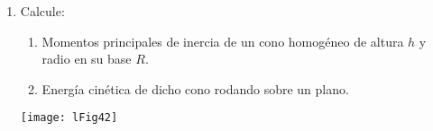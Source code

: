 \documentclass[11pt,spanish,a4paper]{article}
\begin{document}
\begin{enumerate}
\item 
\begin{minipage}[t][3.5cm]{0.5\textwidth}
Calcule:
	\begin{enumerate}
		\item Momentos principales de inercia de un cono homogéneo de altura \(h\) y radio en su base \(R\).
		\item Energía cinética de dicho cono rodando sobre un plano.
	\end{enumerate}
\end{minipage}
\begin{minipage}[c][1cm][t]{0.45\textwidth}
	\texttt{[image: lFig42]}
\end{minipage}




\end{enumerate}
\end{document}
